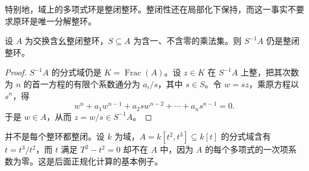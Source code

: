 特别地，域上的多项式环是整闭整环。整闭性还在局部化下保持，而这一事实不要求原环是唯一分解整环。

\begin{corollary}[整闭性的局部化]\label{b3:cor:integrally-closed-localization}
	设 \(A\) 为交换含幺整闭整环，\(S\subseteq A\) 为含一、不含零的乘法集。则 \(S^{-1}A\) 仍是整闭整环。
\end{corollary}
\begin{proof}
	\(S^{-1}A\) 的分式域仍是 \(K=\operatorname{Frac}(A)\)。设 \(z\in K\) 在 \(S^{-1}A\) 上整，把其次数为 \(n\) 的首一方程的有限个系数通分为 \(a_i/s\)，其中 \(s\in S\)。令 \(w=sz\)，乘原方程以 \(s^n\)，得
	\[
		w^n+a_1w^{n-1}+a_2s w^{n-2}+\cdots+a_ns^{n-1}=0.
	\]
	于是 \(w\in A\)，从而 \(z=w/s\in S^{-1}A\)。
\end{proof}

并不是每个整环都整闭。设 \(k\) 为域，\(A=k[t^2,t^3]\subseteq k[t]\) 的分式域含有 \(t=t^3/t^2\)，而 \(t\) 满足 \(T^2-t^2=0\) 却不在 \(A\) 中，因为 \(A\) 的每个多项式的一次项系数为零。这是后面正规化计算的基本例子。
